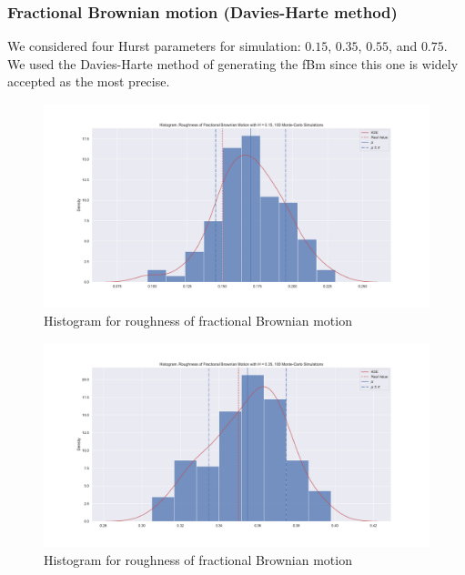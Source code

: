         \subsubsection{Fractional Brownian motion (Davies-Harte method)}
            We considered four Hurst parameters for simulation: $0.15$, $0.35$, $0.55$, and $0.75$. We used the Davies-Harte method of generating 
            the fBm since this one is widely accepted as the most precise.
            \begin{figure}
                \centering
                \includegraphics[width=\linewidth]{fig/Histogram. Roughness of Fractional Brownian Motion with H = 0.15, 100 Monte-Carlo Simulations.pdf}
                \caption{Histogram for roughness of fractional Brownian motion}
            \end{figure}
            \begin{figure}
                \centering
                \includegraphics[width=\linewidth]{fig/Histogram. Roughness of Fractional Brownian Motion with H = 0.35, 100 Monte-Carlo Simulations.pdf}
                \caption{Histogram for roughness of fractional Brownian motion}
            \end{figure}

